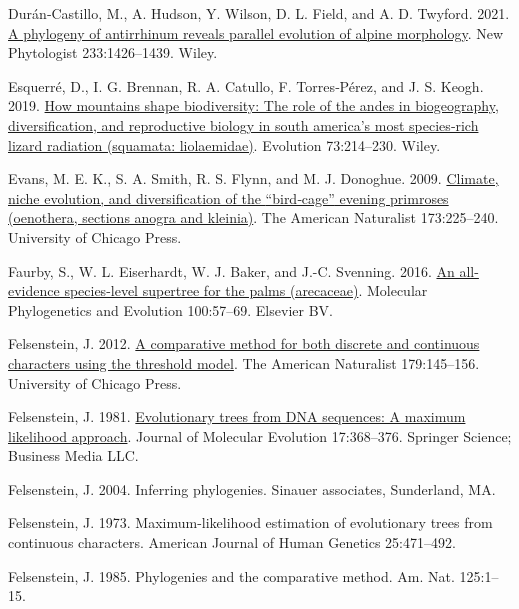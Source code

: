 \documentclass{article}
\newlength{\cslhangindent}
\newenvironment{CSLReferences}[2] %
 {\begin{list}{}{%
  \setlength{\itemindent}{0pt}
  \setlength{\leftmargin}{0pt}
  \setlength{\parsep}{0pt}
  \ifodd #1
   \setlength{\leftmargin}{\cslhangindent}
   \setlength{\itemindent}{-1\cslhangindent}
  \fi
  \setlength{\itemsep}{#2\baselineskip}}}
 {\end{list}}
\begin{document}
\begin{CSLReferences}{1}{0}
Durán‐Castillo, M., A. Hudson, Y. Wilson, D. L. Field, and A. D. Twyford. 2021. \href{https://doi.org/10.1111/nph.17581}{A phylogeny of antirrhinum reveals parallel evolution of alpine morphology}. New Phytologist 233:1426--1439. Wiley.

Esquerré, D., I. G. Brennan, R. A. Catullo, F. Torres‐Pérez, and J. S. Keogh. 2019. \href{https://doi.org/10.1111/evo.13657}{How mountains shape biodiversity: The role of the andes in biogeography, diversification, and reproductive biology in south america's most species‐rich lizard radiation (squamata: liolaemidae)}. Evolution 73:214--230. Wiley.

Evans, M. E. K., S. A. Smith, R. S. Flynn, and M. J. Donoghue. 2009. \href{https://doi.org/10.1086/595757}{Climate, niche evolution, and diversification of the {``bird‐cage''} evening primroses (oenothera, sections anogra and kleinia)}. The American Naturalist 173:225--240. University of Chicago Press.

Faurby, S., W. L. Eiserhardt, W. J. Baker, and J.-C. Svenning. 2016. \href{https://doi.org/10.1016/j.ympev.2016.03.002}{An all-evidence species-level supertree for the palms (arecaceae)}. Molecular Phylogenetics and Evolution 100:57--69. Elsevier BV.

Felsenstein, J. 2012. \href{https://doi.org/10.1086/663681}{A comparative method for both discrete and continuous characters using the threshold model}. The American Naturalist 179:145--156. University of Chicago Press.

Felsenstein, J. 1981. \href{https://doi.org/10.1007/bf01734359}{Evolutionary trees from DNA sequences: A maximum likelihood approach}. Journal of Molecular Evolution 17:368--376. Springer Science; Business Media LLC.

Felsenstein, J. 2004. Inferring phylogenies. Sinauer associates, Sunderland, MA.

Felsenstein, J. 1973. Maximum-likelihood estimation of evolutionary trees from continuous characters. American Journal of Human Genetics 25:471--492.

Felsenstein, J. 1985. Phylogenies and the comparative method. Am. Nat. 125:1--15.


\end{CSLReferences}
\end{document}
